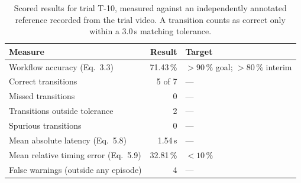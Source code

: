 \begin{table}[htbp]
\centering
\caption{Scored results for trial T-10, measured against an independently annotated reference recorded from the trial video. A transition counts as correct only within a 3.0\,s matching tolerance.}
\label{tab:trial-T-10-summary}
\begin{tabular}{|l|r|l|}
\hline
\textbf{Measure} & \textbf{Result} & \textbf{Target} \\
\hline
Workflow accuracy (Eq.~3.3) & 71.43\,\% & $>90\,\%$ goal; $>80\,\%$ interim \\
\hline
Correct transitions & 5 of 7 & --- \\
\hline
Missed transitions & 0 & --- \\
\hline
Transitions outside tolerance & 2 & --- \\
\hline
Spurious transitions & 0 & --- \\
\hline
Mean absolute latency (Eq.~5.8) & 1.54\,s & --- \\
\hline
Mean relative timing error (Eq.~5.9) & 32.81\,\% & $<10\,\%$ \\
\hline
False warnings (outside any episode) & 4 & --- \\
\hline
\end{tabular}
\end{table}

